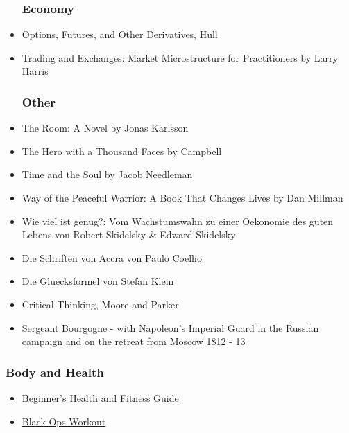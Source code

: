 \begin{itemize}
\subsubsection{Economy}

	\item Options, Futures, and Other Derivatives, Hull

	\item Trading and Exchanges: Market Microstructure for Practitioners by Larry Harris

\subsubsection{Other}

	\item The Room: A Novel by Jonas Karlsson

	\item The Hero with a Thousand Faces by Campbell

	\item Time and the Soul by Jacob Needleman

	\item Way of the Peaceful Warrior: A Book That Changes Lives by Dan Millman

	\item Wie viel ist genug?: Vom Wachstumswahn zu einer Oekonomie des guten Lebens von Robert Skidelsky \& Edward Skidelsky

	\item Die Schriften von Accra von Paulo Coelho

	\item Die Gluecksformel von Stefan Klein

	\item Critical Thinking, Moore and Parker

	\item Sergeant Bourgogne - with Napoleon's Imperial Guard in the Russian campaign and on the retreat from Moscow 1812 - 13
	
\end{itemize}

\subsubsection{Body and Health}

\begin{itemize}
  \item \href{http://liamrosen.com/fitness.html}{Beginner's Health and Fitness Guide}

  \item \href{http://darebee.com/workouts/black-ops-workout.html}{Black Ops Workout}

\end{itemize}
